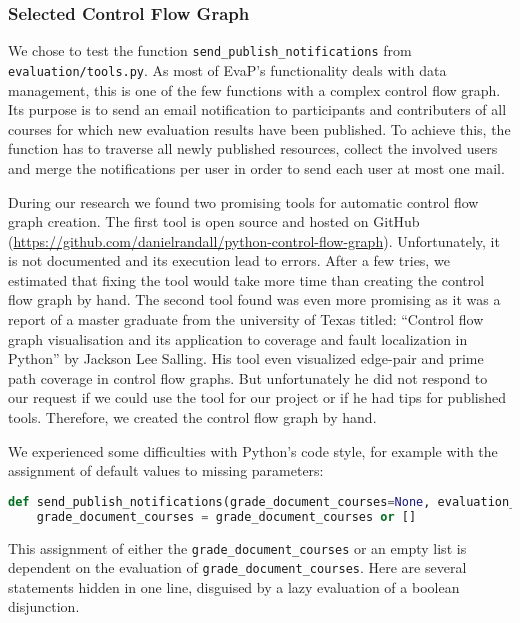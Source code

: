 \usetikzlibrary{arrows,automata}

\subsubsection{Selected Control Flow Graph}
We chose to test the function \texttt{send\_publish\_notifications} from \texttt{evaluation/tools.py}.
As most of EvaP's functionality deals with data management, this is one of the few functions with a complex control flow graph.
Its purpose is to send an email notification to participants and contributers of all courses for which new evaluation results have been published.
To achieve this, the function has to traverse all newly published resources, collect the involved users and merge the notifications per user in order to send each user at most one mail.

During our research we found two promising tools for automatic control flow graph creation. 
The first tool is open source and hosted on GitHub (\url{https://github.com/danielrandall/python-control-flow-graph}). 
Unfortunately, it is not documented and its execution lead to errors. 
After a few tries, we estimated that fixing the tool would take more time than creating the control flow graph by hand.
The second tool found was even more promising as it was a report of a master graduate from the university of Texas titled: 
``Control flow graph visualisation and its application to coverage and fault localization in Python''
by Jackson Lee Salling.
His tool even visualized edge-pair and prime path coverage in control flow graphs.
But unfortunately he did not respond to our request if we could use the tool for our project or if he had tips for published tools.
Therefore, we created the control flow graph by hand.

We experienced some difficulties with Python's code style, for example with the assignment of default values to missing parameters:
\begin{lstlisting}[language=Python, breaklines]
def send_publish_notifications(grade_document_courses=None, evaluation_results_courses=None):
    grade_document_courses = grade_document_courses or []
\end{lstlisting}
This assignment of either the \texttt{grade\_document\_courses} or an empty list is dependent on the evaluation of \texttt{grade\_document\_courses}.
Here are several statements hidden in one line, disguised by a lazy evaluation of a boolean disjunction.



